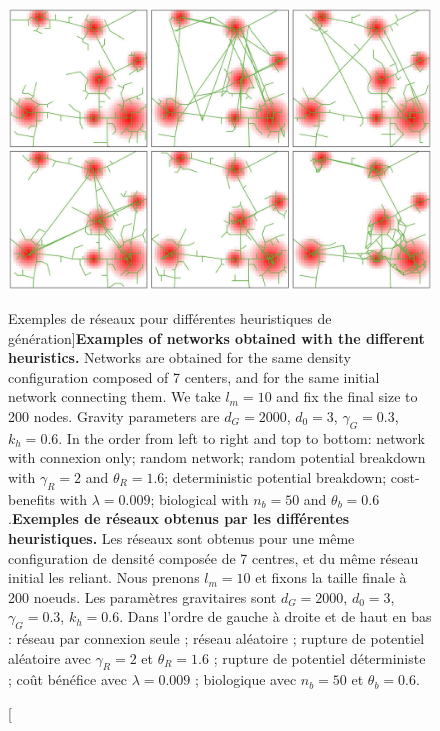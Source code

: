 \begin{figure}
	\includegraphics[width=\linewidth]{Figures/Final/7-1-2-fig-networkgrowth-examples.jpg}
\caption[Network examples for different generation heuristics][Exemples de réseaux pour différentes heuristiques de génération]{\textbf{Examples of networks obtained with the different heuristics.} Networks are obtained for the same density configuration composed of 7 centers, and for the same initial network connecting them. We take $l_m = 10$ and fix the final size to 200 nodes. Gravity parameters are $d_G = 2000$, $d_0 = 3$, $\gamma_G = 0.3$, $k_h = 0.6$. In the order from left to right and top to bottom: network with connexion only; random network; random potential breakdown with $\gamma_R = 2$ and $\theta_R = 1.6$; deterministic potential breakdown; cost-benefits with $\lambda = 0.009$; biological with $n_b = 50$ and $\theta_b = 0.6$.\label{fig:networkgrowth:examples}}{\textbf{Exemples de réseaux obtenus par les différentes heuristiques.} Les réseaux sont obtenus pour une même configuration de densité composée de 7 centres, et du même réseau initial les reliant. Nous prenons $l_m = 10$ et fixons la taille finale à 200 noeuds. Les paramètres gravitaires sont $d_G = 2000$, $d_0 = 3$, $\gamma_G = 0.3$, $k_h = 0.6$. Dans l'ordre de gauche à droite et de haut en bas : réseau par connexion seule ; réseau aléatoire ; rupture de potentiel aléatoire avec $\gamma_R = 2$ et $\theta_R = 1.6$ ; rupture de potentiel déterministe ; coût bénéfice avec $\lambda = 0.009$ ; biologique avec $n_b = 50$ et $\theta_b = 0.6$.\label{fig:networkgrowth:examples}}
\end{figure}

